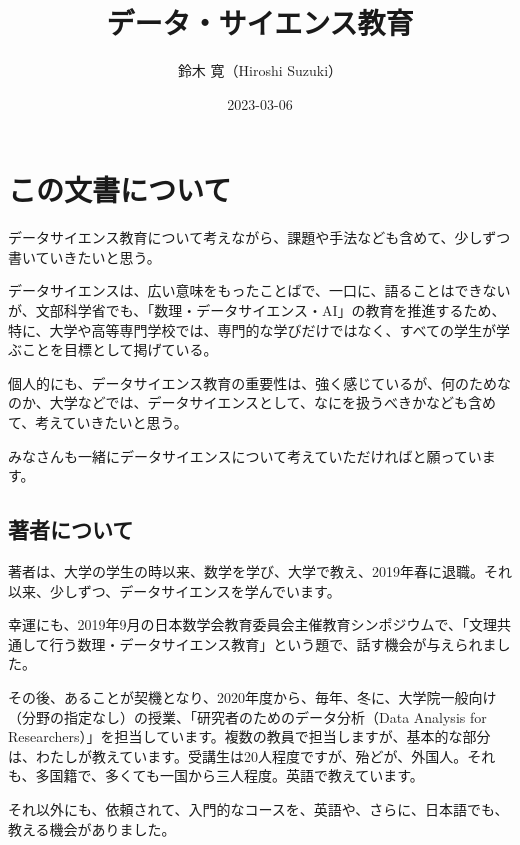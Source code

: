 \documentclass[
]{bxjsbook}
\title{データ・サイエンス教育}
\author{鈴木 寛（Hiroshi Suzuki）}
\date{2023-03-06}
\theoremstyle{definition}
\theoremstyle{definition}
\theoremstyle{definition}
\theoremstyle{definition}
\theoremstyle{remark}
\begin{document}
\maketitle

{
\setcounter{tocdepth}{2}
\tableofcontents
}
\hypertarget{ux3053ux306eux6587ux66f8ux306bux3064ux3044ux3066}{%
\section*{この文書について}\label{ux3053ux306eux6587ux66f8ux306bux3064ux3044ux3066}}

データサイエンス教育について考えながら、課題や手法なども含めて、少しずつ書いていきたいと思う。

データサイエンスは、広い意味をもったことばで、一口に、語ることはできないが、文部科学省でも、「数理・データサイエンス・AI」の教育を推進するため、特に、大学や高等専門学校では、専門的な学びだけではなく、すべての学生が学ぶことを目標として掲げている。

個人的にも、データサイエンス教育の重要性は、強く感じているが、何のためなのか、大学などでは、データサイエンスとして、なにを扱うべきかなども含めて、考えていきたいと思う。

みなさんも一緒にデータサイエンスについて考えていただければと願っています。

\hypertarget{ux8457ux8005ux306bux3064ux3044ux3066}{%
\subsection*{著者について}\label{ux8457ux8005ux306bux3064ux3044ux3066}}

著者は、大学の学生の時以来、数学を学び、大学で教え、2019年春に退職。それ以来、少しずつ、データサイエンスを学んでいます。

幸運にも、2019年9月の日本数学会教育委員会主催教育シンポジウムで、「文理共通して行う数理・データサイエンス教育」という題で、話す機会が与えられました。

その後、あることが契機となり、2020年度から、毎年、冬に、大学院一般向け（分野の指定なし）の授業、「研究者のためのデータ分析（Data Analysis for Researchers）」を担当しています。複数の教員で担当しますが、基本的な部分は、わたしが教えています。受講生は20人程度ですが、殆どが、外国人。それも、多国籍で、多くても一国から三人程度。英語で教えています。

それ以外にも、依頼されて、入門的なコースを、英語や、さらに、日本語でも、教える機会がありました。
\end{document}
